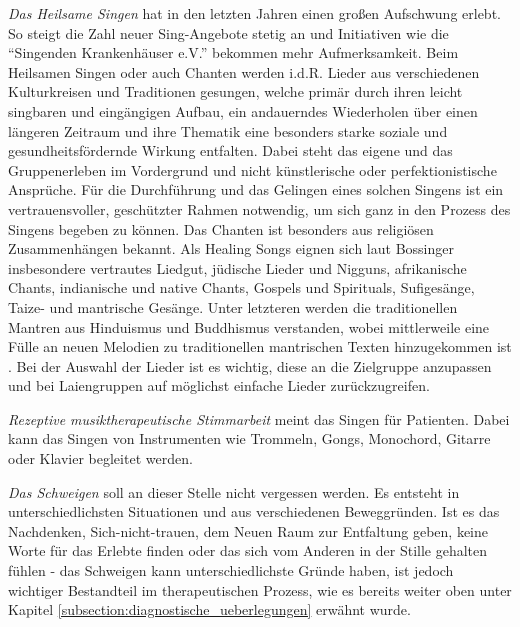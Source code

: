 \emph{Das Heilsame Singen} hat in den letzten Jahren einen großen Aufschwung erlebt. So steigt die Zahl neuer Sing-Angebote stetig an und Initiativen wie die "`Singenden Krankenhäuser e.V."' bekommen mehr Aufmerksamkeit. Beim Heilsamen Singen oder auch Chanten werden i.d.R. Lieder aus verschiedenen Kulturkreisen und Traditionen gesungen, welche primär durch ihren leicht singbaren und eingängigen Aufbau, ein andauerndes Wiederholen über einen längeren Zeitraum und ihre Thematik eine besonders starke soziale und gesundheitsfördernde Wirkung entfalten. Dabei steht das eigene und das Gruppenerleben im Vordergrund und nicht künstlerische oder perfektionistische Ansprüche. Für die Durchführung und das Gelingen eines solchen Singens ist ein vertrauensvoller, geschützter Rahmen notwendig, um sich ganz in den Prozess des Singens begeben zu können. Das Chanten ist besonders aus religiösen Zusammenhängen bekannt. Als Healing Songs eignen sich laut Bossinger insbesondere vertrautes Liedgut, jüdische Lieder und Nigguns, afrikanische Chants, indianische und native Chants, Gospels und Spirituals, Sufigesänge, Taize- und mantrische Gesänge. Unter letzteren werden die traditionellen Mantren aus Hinduismus und Buddhismus verstanden, wobei mittlerweile eine Fülle an neuen Melodien zu traditionellen mantrischen Texten hinzugekommen ist \autocite[vgl.][266 ff.]{bossinger2006}. Bei der Auswahl der Lieder ist es wichtig, diese an die Zielgruppe anzupassen und bei Laiengruppen auf möglichst einfache Lieder zurückzugreifen.

\emph{Rezeptive musiktherapeutische Stimmarbeit} meint das Singen für Patienten. Dabei kann das Singen von Instrumenten wie Trommeln, Gongs, Monochord, Gitarre oder Klavier begleitet werden. 

\emph{Das Schweigen} soll an dieser Stelle nicht vergessen werden. Es entsteht in unterschiedlichsten Situationen und aus verschiedenen Beweggründen. Ist es das Nachdenken, Sich-nicht-trauen, dem Neuen Raum zur Entfaltung geben, keine Worte für das Erlebte finden oder das sich vom Anderen in der Stille gehalten fühlen - das Schweigen kann unterschiedlichste Gründe haben, ist jedoch wichtiger Bestandteil im therapeutischen Prozess, wie es bereits weiter oben unter Kapitel \ref{subsection:diagnostische_ueberlegungen} erwähnt wurde.

